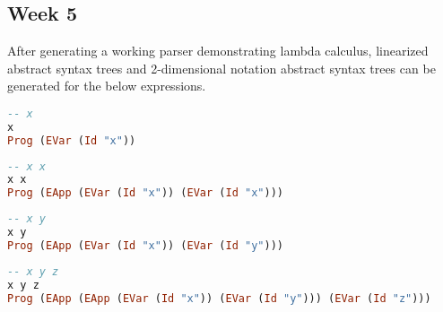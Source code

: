 \documentclass{article}
\theoremstyle{theorem}
\theoremstyle{definition}
\theoremstyle{remark}
\begin{document}
\hfil
{}
\hfil

\newpage

\subsection{Week 5}
After generating a working parser demonstrating lambda calculus, linearized abstract syntax trees and 2-dimensional notation abstract syntax trees can be generated for the below expressions.
\begin{lstlisting}[language=Haskell]
-- x
x 
Prog (EVar (Id "x"))
\end{lstlisting}

\hfil
{}
\hfil

\begin{lstlisting}[language=Haskell]
-- x x
x x
Prog (EApp (EVar (Id "x")) (EVar (Id "x")))
\end{lstlisting}

\hfil
{}
\hfil

\begin{lstlisting}[language=Haskell]
-- x y
x y
Prog (EApp (EVar (Id "x")) (EVar (Id "y")))
\end{lstlisting}

\hfil
{}
\hfil

\begin{lstlisting}[language=Haskell]
-- x y z
x y z
Prog (EApp (EApp (EVar (Id "x")) (EVar (Id "y"))) (EVar (Id "z")))
\end{lstlisting}

\hfil
{}
\hfil
\end{document}
